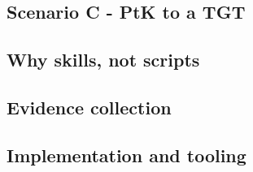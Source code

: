 \subsection{Scenario C - PtK to a TGT}
\unwritten

\subsection{Why skills, not scripts}
\unwritten

\subsection{Evidence collection}
\unwritten

\subsection{Implementation and tooling}
\unwritten
